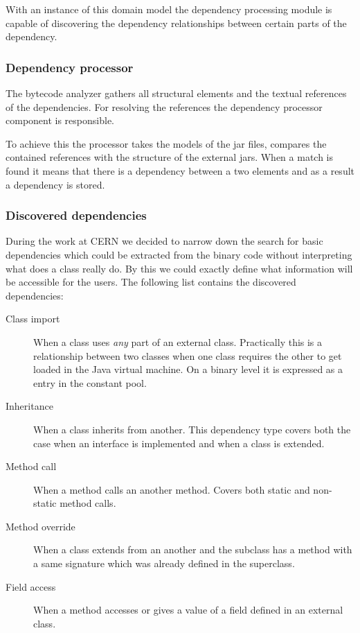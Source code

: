 With an instance of this domain model the dependency processing module is
capable of discovering the dependency relationships between certain parts of the
dependency.
 

\subsubsection{Dependency processor}
The bytecode analyzer gathers all structural elements and the textual references
of the dependencies. For resolving the references the dependency processor
component is responsible.

To achieve this the processor takes the models of the jar files, compares the
contained references with the structure of the external jars. When a match is
found it means that there is a dependency between a two elements and as a result
a dependency is stored.

\subsubsection{Discovered dependencies}
During the work at CERN we decided to narrow down the search for basic
dependencies which could be extracted from the binary code without interpreting
what does a class really do. By this we could exactly define what information
will be accessible for the users. The following list contains the discovered
dependencies:
\begin{description}
\item[Class import] When a class uses \emph{any} part of an external class. 
Practically this is a relationship between two classes when one class requires
the other to get loaded in the Java virtual machine. On a binary level it is 
expressed as a  entry in the constant pool.  
\item[Inheritance] When a class inherits from another. This dependency type 
covers both the case when an interface is implemented and when a class is 
extended. 
\item[Method call] When a method calls an another method. Covers both static 
and non-static method calls.
\item[Method override] When a class extends from an another and the subclass 
has a method with a same signature which was already defined in the superclass.  
\item[Field access] When a method accesses or gives a value of a field defined 
in an external class.
\end{description}


